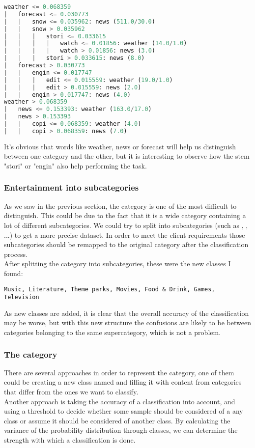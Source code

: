 \begin{lstlisting}[language=Python]
weather <= 0.068359
|   forecast <= 0.030773
|   |   snow <= 0.035962: news (511.0/30.0)
|   |   snow > 0.035962
|   |   |   stori <= 0.033615
|   |   |   |   watch <= 0.01856: weather (14.0/1.0)
|   |   |   |   watch > 0.01856: news (3.0)
|   |   |   stori > 0.033615: news (8.0)
|   forecast > 0.030773
|   |   engin <= 0.017747
|   |   |   edit <= 0.015559: weather (19.0/1.0)
|   |   |   edit > 0.015559: news (2.0)
|   |   engin > 0.017747: news (4.0)
weather > 0.068359
|   news <= 0.153393: weather (163.0/17.0)
|   news > 0.153393
|   |   copi <= 0.068359: weather (4.0)
|   |   copi > 0.068359: news (7.0)
\end{lstlisting}
It's obvious that words like weather, news or forecast will help us distinguish between one category and the other, but it is interesting to observe how the stem "stori" or "engin" also help performing
the task.


\subsubsection{Entertainment into subcategories}
As we saw in the previous section, the category  is one of the most difficult to distinguish. This could be due to the fact that it is a wide category containing a lot of different
subcategories. We could try to split  into subcategories (such as , , ...) to get a more precise dataset. In order to meet the
client requirements those subcategories should be remapped to the original  category after the classification process. \\
After splitting the  category into subcategories, these were the new classes I found: \\
\begin{lstlisting} 
Music, Literature, Theme parks, Movies, Food & Drink, Games, Television
\end{lstlisting} 
As new classes are added, it is clear that the overall accuracy of the classification may be worse, but with this new structure the confusions are likely to be between categories belonging to the same
supercategory, which is not a problem.
 

\subsubsection{The  category}
There are several approaches in order to represent the  category, one of them could be creating a new class named  and filling it with content from categories that 
differ from the ones we want to classify.\\
Another approach is taking the accuracy of a classification into account, and using a threshold to decide whether some sample should be considered of a any class or assume it should be considered of 
another class. 
By calculating the variance of the probability distribution through classes, we can determine the strength with which a classification is done.   


